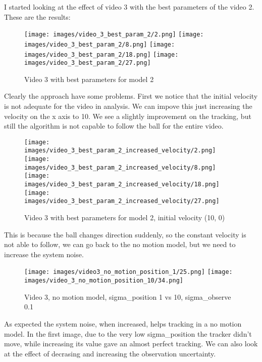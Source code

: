 \documentclass{ETHExercise}
\begin{document}
I started looking at the effect of video 3 with the best parameters of the video 2.
These are the results:
\begin{figure}[!h]
    \texttt{[image: images/video\_3\_best\_param\_2/2.png]}
  \endminipage
    \texttt{[image: images/video\_3\_best\_param\_2/8.png]}
  \endminipage
    \texttt{[image: images/video\_3\_best\_param\_2/18.png]}
  \endminipage\space
    \texttt{[image: images/video\_3\_best\_param\_2/27.png]}
  \endminipage
  \caption{Video 3 with best parameters for model 2}
\end{figure}
 Clearly the approach have some problems. First we notice that the initial velocity is not adequate for the 
 video in analysis. We can impove this just increasing the velocity on the x axis to 10.
 We see a slightly improvement on the tracking, but still the algorithm is not capable to follow the ball for the entire video.

\begin{figure}[!h]
    \texttt{[image: images/video\_3\_best\_param\_2\_increased\_velocity/2.png]}
  \endminipage
    \texttt{[image: images/video\_3\_best\_param\_2\_increased\_velocity/8.png]}
  \endminipage
    \texttt{[image: images/video\_3\_best\_param\_2\_increased\_velocity/18.png]}
  \endminipage\space
    \texttt{[image: images/video\_3\_best\_param\_2\_increased\_velocity/27.png]}
  \endminipage
  \caption{Video 3 with best parameters for model 2, initial velocity (10, 0)}
\end{figure}

This is because the ball changes direction suddenly, so the constant velocity is not able to follow, we can go back to the no motion model,
but we need to increase the system noise.

\begin{figure}[!h]
    \texttt{[image: images/video3\_no\_motion\_position\_1/25.png]}
  \endminipage
    \texttt{[image: images/video\_3\_no\_motion\_position\_10/34.png]}
  \endminipage
  \caption{Video 3, no motion model, sigma\_position 1 vs 10, sigma\_observe 0.1}
\end{figure}

As expected the system noise, when increased, helps tracking in a no motion model. In the first 
image, due to the very low sigma\_position the tracker didn't move, while increasing its value 
gave an almost perfect tracking.
\newpage
We can also look at the effect of decrasing and increasing the observation uncertainty.
\end{document}

